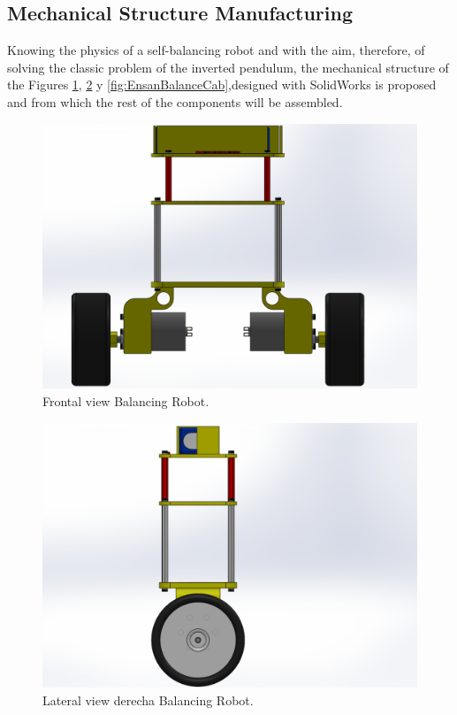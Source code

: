 \subsection{Mechanical Structure Manufacturing}
Knowing the physics of a self-balancing robot \cite{6845943} \cite{7112017} and with the aim, therefore, of solving the classic problem of the inverted pendulum, the mechanical structure of the Figures \ref{fig:EnsanBalanceFront}, \ref{fig:EnsanBalanceLateral} y \ref{fig:EnsanBalanceCab},designed with SolidWorks is proposed and from which the rest of the components will be assembled.

\begin{center}
	\begin{figure}[H]
		\center
		\includegraphics[trim = 1cm 0mm 2.7cm 0mm,clip, angle=0, scale = 0.4]{imagenes/Balancing_Robot/EnsanBalanceFront.PDF}
		\caption{Frontal view Balancing Robot.}
		\label{fig:EnsanBalanceFront}
	\end{figure}
\end{center}

\begin{center}
	\begin{figure}[H]
		\center
		\includegraphics[trim = 5cm 0mm 10cm 0mm,clip, angle=0, scale = 0.5]{imagenes/Balancing_Robot/EnsanBalanceLateral.PDF}
		\caption{Lateral view derecha Balancing Robot.}
		\label{fig:EnsanBalanceLateral}
	\end{figure}
\end{center}

